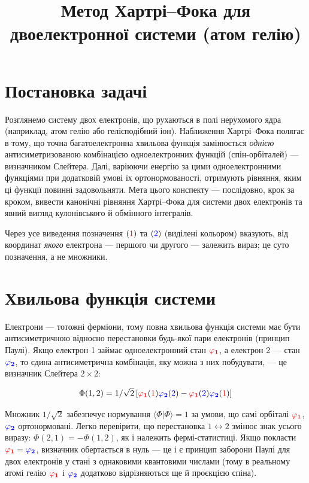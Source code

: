 \documentclass[]{article}
\title{Метод Хартрі--Фока для двоелектронної системи (атом гелію)}
\author{}
\date{}
\let\vphi\varphi
\def\f{(\textcolor{red}{1})}
\def\s{(\textcolor{blue}{2})}
\def\oa{\textcolor{red}{ \vphi_{\mathbf{1}}} }
\def\ob{\textcolor{blue}{ \vphi_{\mathbf{2}}} }
\def\cPhi{\oa\f \ob\s - \oa\s \ob\f} %
\begin{document}
\maketitle

\section{Постановка задачі}

Розглянемо систему двох електронів, що рухаються в полі нерухомого ядра (наприклад, атом гелію або гелієподібний іон). Наближення Хартрі--Фока полягає в тому, що точна багатоелектронна хвильова функція замінюється \emph{однією} антисиметризованою комбінацією одноелектронних функцій (спін-орбіталей) --- визначником Слейтера. Далі, варіюючи енергію за цими одноелектронними функціями при додатковій умові їх ортонормованості, отримують рівняння, яким ці функції повинні задовольняти. Мета цього конспекту --- послідовно, крок за кроком, вивести канонічні рівняння Хартрі--Фока для системи двох електронів та явний вигляд кулонівського й обмінного інтегралів.

Через усе виведення позначення $\f$ та $\s$ (виділені кольором) вказують, від координат \emph{якого} електрона --- першого чи другого --- залежить вираз; це суто позначення, а не множники.

\section{Хвильова функція системи}

Електрони --- тотожні ферміони, тому повна хвильова функція системи має бути антисиметричною відносно перестановки будь-якої пари електронів (принцип Паулі). Якщо електрон 1 займає одноелектронний стан $\oa$, а електрон 2 --- стан $\ob$, то єдина антисиметрична комбінація, яку можна з них побудувати, --- це визначник Слейтера $2\times2$:

\begin{equation*}
	\Phi(1, 2) ={1}/{\sqrt2}\left[\cPhi\right]
\end{equation*}

Множник $1/\sqrt2$ забезпечує нормування $\langle\Phi|\Phi\rangle=1$ за умови, що самі орбіталі $\oa$, $\ob$ ортонормовані. Легко перевірити, що перестановка $1\leftrightarrow2$ змінює знак усього виразу: $\Phi(2,1)=-\Phi(1,2)$, як і належить фермі-статистиці. Якщо покласти $\oa=\ob$, визначник обертається в нуль --- це і є принцип заборони Паулі для двох електронів у стані з однаковими квантовими числами (тому в реальному атомі гелію $\oa$ і $\ob$ додатково відрізняються ще й проєкцією спіна).
\end{document}
